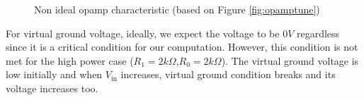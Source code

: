 \begin{figure}[H]
	\caption{Non ideal opamp characteristic (based on Figure \ref{fig:opamptune})}
	\label{fig:opampnonideal}
\end{figure}
For virtual ground voltage, ideally, we expect the voltage to be $0V$ regardless since it is a critical condition for our computation. However, this condition is not met for the high power case ($R_1=2k\Omega$,$R_0=2k\Omega$). The virtual ground voltage is low initially and when $V_{\text{in}}$ increases, virtual ground condition breaks and its voltage increases too.

